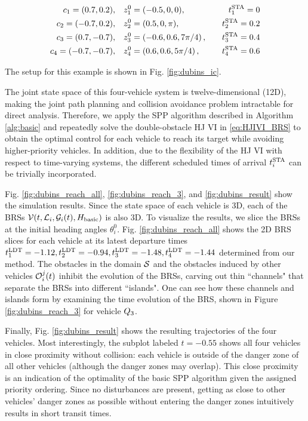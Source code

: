 \begin{equation}
\begin{aligned}
c_1 = (0.7, 0.2), \quad& z_1^0 = (-0.5, 0, 0), \quad & t^\text{STA}_1 = 0 \\
c_2 = (-0.7, 0.2), \quad& z_2^0 = (0.5, 0, \pi), \quad & t^\text{STA}_2 = 0.2 \\
c_3 = (0.7, -0.7), \quad& z_3^0 = \left(-0.6, 0.6, 7\pi/4\right), \quad & t^\text{STA}_3 = 0.4\\
c_4 = (-0.7, -0.7), \quad & z_4^0 = \left(0.6, 0.6, 5\pi/4\right), \quad & t^\text{STA}_4 = 0.6
\end{aligned}
\end{equation}

The setup for this example is shown in Fig. \ref{fig:dubins_ic}. 

The joint state space of this four-vehicle system is twelve-dimensional (12D), making the joint path planning and collision avoidance problem intractable for direct analysis. Therefore, we apply the SPP algorithm described in Algorithm \ref{alg:basic} and repeatedly solve the double-obstacle HJ VI in \eqref{eq:HJIVI_BRS} to obtain the optimal control for each vehicle to reach its target while avoiding higher-priority vehicles. In addition, due to the flexibility of the HJ VI with respect to time-varying systems, the different scheduled times of arrival $t^\text{STA}_i$ can be trivially incorporated. 

Fig. \ref{fig:dubins_reach_all}, \ref{fig:dubins_reach_3}, and \ref{fig:dubins_result} show the simulation results. Since the state space of each vehicle is 3D, each of the BRSs $\mathcal{V}(t, \mathcal{L}_i, \mathcal{G}_i(t), H_\text{basic})$ is also 3D. To visualize the results, we slice the BRSs at the initial heading angles $\theta_i^0$. Fig. \ref{fig:dubins_reach_all} shows the 2D BRS slices for each vehicle at its latest departure times $t^\text{LDT}_1=-1.12, t^\text{LDT}_2=-0.94,t^\text{LDT}_3=-1.48,t^\text{LDT}_4=-1.44$ determined from our method. The obstacles in the domain $\mathcal{S}$ and the obstacles induced by other vehicles $\mathcal{O}_i^j(t)$ inhibit the evolution of the BRSs, carving out thin ``channels" that separate the BRSs into different ``islands". One can see how these channels and islands form by examining the time evolution of the BRS, shown in Figure \ref{fig:dubins_reach_3} for vehicle $Q_{3}$. 

Finally, Fig. \ref{fig:dubins_result} shows the resulting trajectories of the four vehicles. Most interestingly, the subplot labeled $t=-0.55$ shows all four vehicles in close proximity without collision: each vehicle is outside of the danger zone of all other vehicles (although the danger zones may overlap). This close proximity is an indication of the optimality of the basic SPP algorithm given the assigned priority ordering. Since no disturbances are present, getting as close to other vehicles' danger zones as possible without entering the danger zones intuitively results in short transit times.

